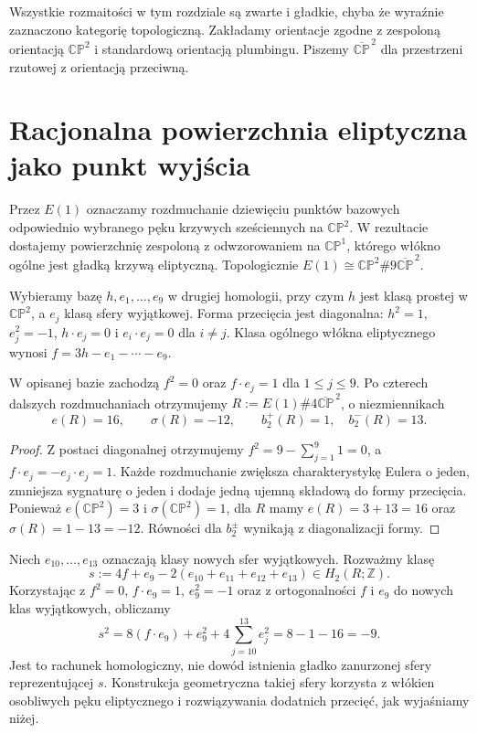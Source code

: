 Wszystkie rozmaitości w tym rozdziale są zwarte i gładkie,
chyba że wyraźnie zaznaczono kategorię topologiczną.
Zakładamy orientacje zgodne z zespoloną orientacją
$\mathbb{CP}^{2}$ i standardową orientacją plumbingu.
Piszemy $\overline{\mathbb{CP}}^{\,2}$ dla przestrzeni
rzutowej z orientacją przeciwną.

\section{Racjonalna powierzchnia eliptyczna jako punkt wyjścia}
\label{sec:tg-park-e1}

\begin{definicja}
Przez $E(1)$ oznaczamy rozdmuchanie dziewięciu punktów
bazowych odpowiednio wybranego pęku krzywych sześciennych
na $\mathbb{CP}^{2}$. W rezultacie dostajemy powierzchnię
zespoloną z odwzorowaniem na $\mathbb{CP}^{1}$, którego
włókno ogólne jest gładką krzywą eliptyczną. Topologicznie
$E(1)\cong\mathbb{CP}^{2}\#9\overline{\mathbb{CP}}^{\,2}$.
\end{definicja}

Wybieramy bazę $h,e_1,\ldots,e_9$ w drugiej homologii,
przy czym $h$ jest klasą prostej w $\mathbb{CP}^{2}$,
a $e_j$ klasą sfery wyjątkowej. Forma przecięcia jest
diagonalna: $h^2=1$, $e_j^2=-1$, $h\cdot e_j=0$
i $e_i\cdot e_j=0$ dla $i\ne j$.
Klasa ogólnego włókna eliptycznego wynosi
$f=3h-e_1-\cdots-e_9$.

\begin{lemat}
\label{lem:tg-park-fiber}
W opisanej bazie zachodzą $f^2=0$ oraz $f\cdot e_j=1$
dla $1\le j\le9$. Po czterech dalszych rozdmuchaniach
otrzymujemy $R:=E(1)\#4\overline{\mathbb{CP}}^{\,2}$,
o niezmiennikach
\[
e(R)=16,\qquad \sigma(R)=-12,\qquad
b_2^+(R)=1,\quad b_2^-(R)=13.
\]
\end{lemat}

\begin{proof}
Z postaci diagonalnej otrzymujemy
$f^2=9-\sum_{j=1}^{9}1=0$,
a $f\cdot e_j=-e_j\cdot e_j=1$.
Każde rozdmuchanie zwiększa charakterystykę Eulera
o jeden, zmniejsza sygnaturę o jeden i dodaje jedną
ujemną składową do formy przecięcia. Ponieważ
$e(\mathbb{CP}^{2})=3$ i
$\sigma(\mathbb{CP}^{2})=1$, dla $R$ mamy
$e(R)=3+13=16$ oraz $\sigma(R)=1-13=-12$.
Równości dla $b_2^\pm$ wynikają z diagonalizacji formy.
\end{proof}

\begin{przyklad}
\label{ex:tg-park-S}
Niech $e_{10},\ldots,e_{13}$ oznaczają klasy nowych
sfer wyjątkowych. Rozważmy klasę
\[
s:=4f+e_9-2(e_{10}+e_{11}+e_{12}+e_{13})\in H_2(R;\mathbb Z).
\]
Korzystając z $f^2=0$, $f\cdot e_9=1$,
$e_9^2=-1$ oraz z ortogonalności $f$ i $e_9$ do nowych klas
wyjątkowych, obliczamy
\[
s^2=8(f\cdot e_9)+e_9^2
   +4\sum_{j=10}^{13}e_j^2=8-1-16=-9.
\]
Jest to rachunek homologiczny, nie dowód istnienia
gładko zanurzonej sfery reprezentującej $s$.
Konstrukcja geometryczna takiej sfery korzysta z włókien
osobliwych pęku eliptycznego i rozwiązywania dodatnich
przecięć, jak wyjaśniamy niżej.
\end{przyklad}

